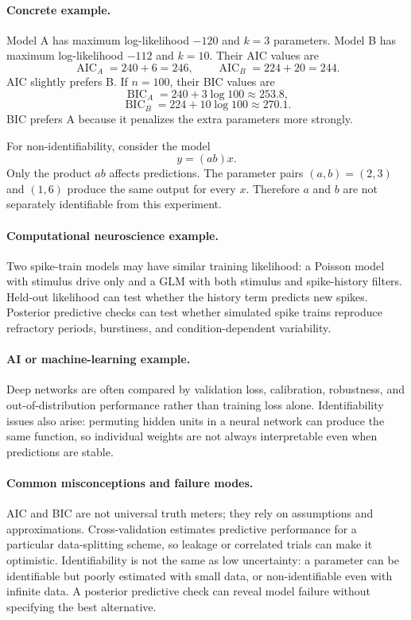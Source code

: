 \paragraph{Concrete example.}
Model A has maximum log-likelihood \(-120\) and \(k=3\) parameters. Model B has maximum log-likelihood \(-112\) and \(k=10\). Their AIC values are
\[
\operatorname{AIC}_A=240+6=246,\qquad
\operatorname{AIC}_B=224+20=244.
\]
AIC slightly prefers B. If \(n=100\), their BIC values are
\[
\operatorname{BIC}_A=240+3\log 100\approx253.8,
\]
\[
\operatorname{BIC}_B=224+10\log 100\approx270.1.
\]
BIC prefers A because it penalizes the extra parameters more strongly.

For non-identifiability, consider the model
\[
y=(ab)x.
\]
Only the product \(ab\) affects predictions. The parameter pairs \((a,b)=(2,3)\) and \((1,6)\) produce the same output for every \(x\). Therefore \(a\) and \(b\) are not separately identifiable from this experiment.

\paragraph{Computational neuroscience example.}
Two spike-train models may have similar training likelihood: a Poisson model with stimulus drive only and a GLM with both stimulus and spike-history filters. Held-out likelihood can test whether the history term predicts new spikes. Posterior predictive checks can test whether simulated spike trains reproduce refractory periods, burstiness, and condition-dependent variability.

\paragraph{AI or machine-learning example.}
Deep networks are often compared by validation loss, calibration, robustness, and out-of-distribution performance rather than training loss alone. Identifiability issues also arise: permuting hidden units in a neural network can produce the same function, so individual weights are not always interpretable even when predictions are stable.

\paragraph{Common misconceptions and failure modes.}
AIC and BIC are not universal truth meters; they rely on assumptions and approximations. Cross-validation estimates predictive performance for a particular data-splitting scheme, so leakage or correlated trials can make it optimistic. Identifiability is not the same as low uncertainty: a parameter can be identifiable but poorly estimated with small data, or non-identifiable even with infinite data. A posterior predictive check can reveal model failure without specifying the best alternative.

